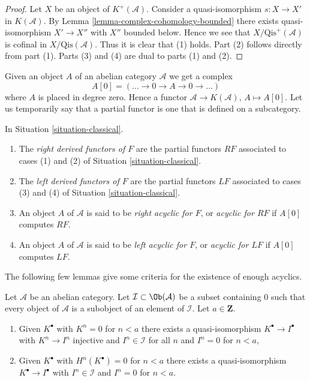 \begin{proof}
Let $X$ be an object of $K^{+}(\mathcal{A})$.
Consider a quasi-isomorphism $s : X \to X'$ in $K(\mathcal{A})$.
By
Lemma \ref{lemma-complex-cohomology-bounded}
there exists quasi-isomorphism $X' \to X''$ with $X''$ bounded below.
Hence we see that $X/\text{Qis}^+(\mathcal{A})$ is cofinal
in $X/\text{Qis}(\mathcal{A})$. Thus it is clear that (1) holds.
Part (2) follows directly from part (1).
Parts (3) and (4) are dual to parts (1) and (2).
\end{proof}

\noindent
Given an object $A$ of an abelian category $\mathcal{A}$ we get a complex
$$
A[0] = ( \ldots \to 0 \to A \to 0 \to \ldots )
$$
where $A$ is placed in degree zero. Hence a functor
$\mathcal{A} \to K(\mathcal{A})$, $A \mapsto A[0]$.
Let us temporarily say that a partial functor is one that is
defined on a subcategory.

\begin{definition}
\label{definition-derived-functor}
In
Situation \ref{situation-classical}.
\begin{enumerate}
\item The {\it right derived functors of $F$} are the partial functors
$RF$ associated to cases (1) and (2) of
Situation \ref{situation-classical}.
\item The {\it left derived functors of $F$} are the partial functors
$LF$ associated to cases (3) and (4) of
Situation \ref{situation-classical}.
\item An object $A$ of $\mathcal{A}$ is said to be
{\it right acyclic for $F$}, or {\it acyclic for $RF$}
if $A[0]$ computes $RF$.
\item An object $A$ of $\mathcal{A}$ is said to be
{\it left acyclic for $F$}, or {\it acyclic for $LF$}
if $A[0]$ computes $LF$.
\end{enumerate}
\end{definition}

\noindent
The following few lemmas give some criteria for the existence of
enough acyclics.

\begin{lemma}
\label{lemma-subcategory-right-resolution}
Let $\mathcal{A}$ be an abelian category. Let
$\mathcal{I} \subset \Ob(\mathcal{A})$ be a subset containing $0$
such that every object of $\mathcal{A}$ is a subobject of an element of
$\mathcal{I}$. Let $a \in \mathbf{Z}$.
\begin{enumerate}
\item Given $K^\bullet$ with $K^n = 0$ for $n < a$
there exists a quasi-isomorphism $K^\bullet \to I^\bullet$
with $K^n \to I^n$ injective and $I^n \in \mathcal{I}$ for all $n$
and $I^n = 0$ for $n < a$,
\item Given $K^\bullet$ with $H^n(K^\bullet) = 0$
for $n < a$ there exists a quasi-isomorphism $K^\bullet \to I^\bullet$
with $I^n \in \mathcal{I}$ and $I^n = 0$ for $n < a$.
\end{enumerate}
\end{lemma}

